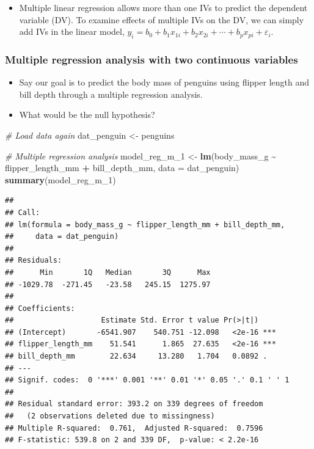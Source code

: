 \documentclass[
]{book}
\newenvironment{Shaded}{\begin{snugshade}}{\end{snugshade}}
\newcommand{\AttributeTok}[1]{\textcolor[rgb]{0.13,0.29,0.53}{#1}}
\newcommand{\CommentTok}[1]{\textcolor[rgb]{0.56,0.35,0.01}{\textit{#1}}}
\newcommand{\FunctionTok}[1]{\textcolor[rgb]{0.13,0.29,0.53}{\textbf{#1}}}
\newcommand{\NormalTok}[1]{#1}
\newcommand{\OtherTok}[1]{\textcolor[rgb]{0.56,0.35,0.01}{#1}}
\newcommand{\SpecialCharTok}[1]{\textcolor[rgb]{0.81,0.36,0.00}{\textbf{#1}}}
\providecommand{\tightlist}{%
  \setlength{\itemsep}{0pt}\setlength{\parskip}{0pt}}
\begin{document}
\begin{itemize}
\tightlist
\item
  Multiple linear regression allows more than one IVs to predict the dependent variable (DV). To examine effects of multiple IVs on the DV, we can simply add IVs in the linear model, \(y_i = b_0 + b_1 x_{1i} + b_2 x_{2i} + \cdots + b_p x_{pi} + \varepsilon_i\).
\end{itemize}

\subsubsection{Multiple regression analysis with two continuous variables}\label{multiple-regression-analysis-with-two-continuous-variables}

\begin{itemize}
\item
  Say our goal is to predict the body mass of penguins using flipper length and bill depth through a multiple regression analysis.
\item
  What would be the null hypothesis?
\end{itemize}

\begin{Shaded}
\begin{Highlighting}[]
\CommentTok{\# Load data again}
\NormalTok{dat\_penguin }\OtherTok{\textless{}{-}}\NormalTok{ penguins}

\CommentTok{\# Multiple regression analysis}
\NormalTok{model\_reg\_m\_1 }\OtherTok{\textless{}{-}} \FunctionTok{lm}\NormalTok{(body\_mass\_g }\SpecialCharTok{\textasciitilde{}}\NormalTok{ flipper\_length\_mm }\SpecialCharTok{+}\NormalTok{ bill\_depth\_mm, }\AttributeTok{data =}\NormalTok{ dat\_penguin)}
\FunctionTok{summary}\NormalTok{(model\_reg\_m\_1)}
\end{Highlighting}
\end{Shaded}

\begin{verbatim}
## 
## Call:
## lm(formula = body_mass_g ~ flipper_length_mm + bill_depth_mm, 
##     data = dat_penguin)
## 
## Residuals:
##      Min       1Q   Median       3Q      Max 
## -1029.78  -271.45   -23.58   245.15  1275.97 
## 
## Coefficients:
##                    Estimate Std. Error t value Pr(>|t|)    
## (Intercept)       -6541.907    540.751 -12.098   <2e-16 ***
## flipper_length_mm    51.541      1.865  27.635   <2e-16 ***
## bill_depth_mm        22.634     13.280   1.704   0.0892 .  
## ---
## Signif. codes:  0 '***' 0.001 '**' 0.01 '*' 0.05 '.' 0.1 ' ' 1
## 
## Residual standard error: 393.2 on 339 degrees of freedom
##   (2 observations deleted due to missingness)
## Multiple R-squared:  0.761,  Adjusted R-squared:  0.7596 
## F-statistic: 539.8 on 2 and 339 DF,  p-value: < 2.2e-16
\end{verbatim}
\end{document}
